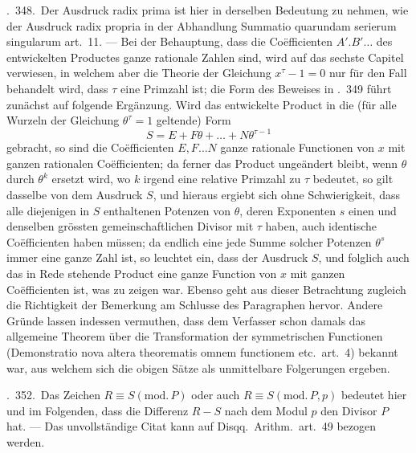 \textsection.\ 348.\ Der Ausdruck radix prima ist hier in derselben Bedeutung zu nehmen, wie der Ausdruck radix propria in der Abhandlung Summatio quarundam serierum singularum art.\ 11. --- Bei der Behauptung, dass die Coëfficienten $A'.B'\ldots$ des entwickelten Productes ganze rationale Zahlen sind, wird auf das sechste Capitel verwiesen, in welchem aber die Theorie der Gleichung $x^\tau-1=0$ nur für den Fall behandelt wird, dass $\tau$ eine Primzahl ist; die Form des Beweises in \textsection.\ 349 führt zunächst auf folgende Ergänzung. Wird das entwickelte Product in die (für alle Wurzeln der Gleichung $\theta^\tau=1$ geltende) Form
\[
S=E+F\theta+\ldots+N\theta^{\tau-1}
\]
gebracht, so sind die Coëfficienten $E,F\ldots N$ ganze rationale Functionen von $x$ mit ganzen rationalen Coëfficienten; da ferner das Product ungeändert bleibt, wenn $\theta$ durch $\theta^k$ ersetzt wird, wo $k$ irgend eine relative Primzahl zu $\tau$ bedeutet, so gilt dasselbe von dem Ausdruck $S$, und hieraus ergiebt sich ohne Schwierigkeit, dass alle diejenigen in $S$ enthaltenen Potenzen von $\theta$, deren Exponenten $s$ einen und denselben grössten gemeinschaftlichen Divisor mit $\tau$ haben, auch identische Coëfficienten haben müssen; da endlich eine jede Summe solcher Potenzen $\theta^s$ immer eine ganze Zahl ist, so leuchtet ein, dass der Ausdruck $S$, und folglich auch das in Rede stehende Product eine ganze Function von $x$ mit ganzen Coëfficienten ist, was zu zeigen war. Ebenso geht aus dieser Betrachtung zugleich die Richtigkeit der Bemerkung am Schlusse des Paragraphen hervor. Andere Gründe lassen indessen vermuthen, dass dem Verfasser schon damals das allgemeine Theorem über die Transformation der symmetrischen Functionen (Demonstratio nova altera theorematis omnem functionem etc.\ art.\ 4) bekannt war, aus welchem sich die obigen Sätze als unmittelbare Folgerungen ergeben.

\textsection.\ 352.\ Das Zeichen $R\equiv S(\mathrm{mod.}\,P)$ oder auch $R\equiv S(\mathrm{mod.}\,P,p)$ bedeutet hier und im 
Folgenden, dass die Differenz $R-S$ nach dem Modul $p$ den Divisor $P$ hat. --- Das unvollständige Citat kann auf Disqq.\ Arithm.\ art.\ 49 bezogen werden.

